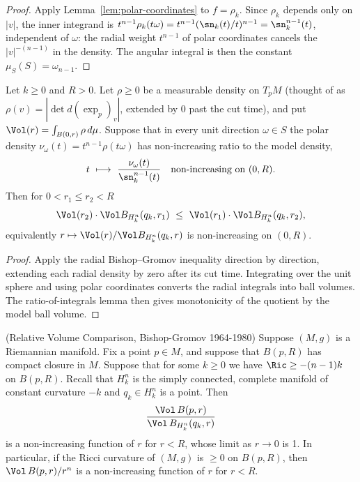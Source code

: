 \begin{proof}
\sketch
{}
Apply Lemma~\ref{lem:polar-coordinates} to $f=\rho_k$. Since $\rho_k$ depends only
on $|v|$, the inner integrand is $t^{n-1}\rho_k(t\omega)=t^{n-1}(\sn_k(t)/t)^{n-1}
=\sn_k^{n-1}(t)$, independent of $\omega$: the radial weight $t^{n-1}$ of polar
coordinates cancels the $|v|^{-(n-1)}$ in the density. The angular integral is then
the constant $\mu_S(S)=\omega_{n-1}$.
\end{proof}

\begin{lemma}
\label{lem:bishop-gromov-ball}
\leanok



Let $k\ge0$ and $R>0$. Let $\rho\ge0$ be a measurable density on $T_pM$ (thought of
as $\rho(v)=|\det d(\exp_p)_v|$, extended by $0$ past the cut time), and put
$\Vol(r)=\int_{B(0,r)}\rho\,d\mu$. Suppose that in every unit direction
$\omega\in S$ the polar density $\nu_\omega(t)=t^{n-1}\rho(t\omega)$ has
non-increasing ratio to the model density,
$$t\ \longmapsto\ \frac{\nu_\omega(t)}{\sn_k^{n-1}(t)}
\quad\text{non-increasing on }(0,R).$$
Then for $0<r_1\le r_2<R$
$$\Vol(r_2)\cdot\Vol B_{H^n_k}(q_k,r_1)\ \le\
\Vol(r_1)\cdot\Vol B_{H^n_k}(q_k,r_2),$$
equivalently $r\mapsto\Vol(r)/\Vol B_{H^n_k}(q_k,r)$ is non-increasing on $(0,R)$.
\end{lemma}

\begin{proof}
\sketch
{}
\leanok
Apply the radial Bishop--Gromov inequality direction by direction, extending each radial density by zero after its cut time. Integrating over the unit sphere and using polar coordinates converts the radial integrals into ball volumes. The ratio-of-integrals lemma then gives monotonicity of the quotient by the model ball volume.
\end{proof}


\begin{theorem}
\label{thm:bishop-gromov}
\label{BishopGromov}


(Relative Volume Comparison, Bishop-Gromov 1964-1980) Suppose $(M,
g)$ is a Riemannian manifold. Fix a point $p\in M$, and suppose that
$B(p,R)$ has compact closure in $M$. Suppose that for some $k\ge 0$
we have $\Ric \geq -(n-1)k$ on $B(p,R)$. Recall that $H^n_k$ is
the simply connected, complete manifold of constant curvature $-k$
and $q_k\in H^n_k$ is a point. Then
\[ \frac{\Vol\,B(p,r)}{\Vol\, B_{H^n_k}(q_k,r)} \]
is a non-increasing function of $r$ for $r<R$, whose limit as $r\rightarrow 0$
is 1. In particular, if the Ricci curvature of $(M,g)$ is $\ge 0$ on $B(p,R)$,
then $\Vol\,B(p,r)/r^n$ is a non-increasing function of $r$ for $r<R$.
\end{theorem}

